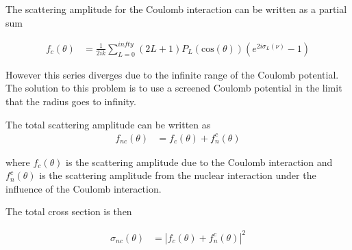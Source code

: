 The scattering amplitude for the Coulomb interaction can be written as a partial sum

\begin{align*}
f_{c}\left(\theta\right) &= \frac{1}{2ik}\sum_{L=0}^{infty}\left(2L+1\right)P_{L}\left(\textrm{cos}\left(\theta\right)\right)\left(e^{2i\sigma_{L}\left(\nu\right)}-1\right)
\end{align*}

However this series diverges due to the infinite range of the Coulomb potential. The solution to this problem is to use a screened Coulomb potential in the limit that the radius goes to infinity.

The total scattering amplitude can be written as 
\begin{align*}
f_{nc}\left(\theta\right) &= f_{c}\left(\theta\right) + f_{n}^{c}\left(\theta\right)
\end{align*}

where $f_{c}\left(\theta\right)$ is the scattering amplitude due to the Coulomb interaction and $f_{n}^{c}\left(\theta\right)$ is the scattering amplitude from the nuclear interaction under the influence of the Coulomb interaction.

The total cross section is then

\begin{align*}
\sigma_{nc}\left(\theta\right) &= |f_{c}\left(\theta\right)+f_{n}^{c}\left(\theta\right)|^{2}
\end{align*}